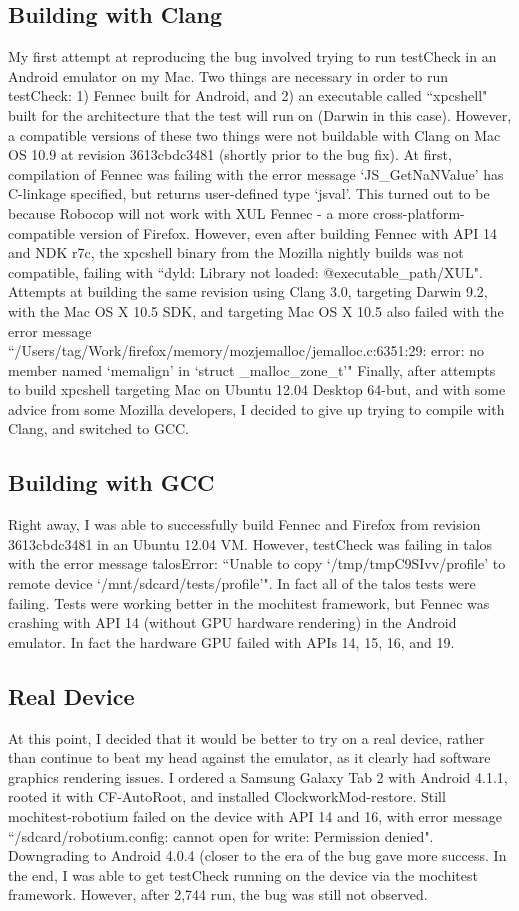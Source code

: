 \documentclass[letterpaper,twocolumn,10pt]{article}
\begin{document}
\subsection{Building with Clang}
My first attempt at reproducing the bug involved trying to run testCheck in an Android emulator on my Mac.  Two things are necessary in order to run testCheck: 1) Fennec built for Android, and 2) an executable called ``xpcshell" built for the architecture that the test will run on (Darwin in this case).  However, a compatible versions of these two things were not buildable with Clang on Mac OS 10.9 at revision 3613cbdc3481 (shortly prior to the bug fix).  At first, compilation of Fennec was failing with the error message `JS\_GetNaNValue' has C-linkage specified, but returns user-defined type `jsval'.  This turned out to be because Robocop will not work with XUL Fennec - a more cross-platform-compatible version of Firefox.  However, even after building Fennec with API 14 and NDK r7c, the xpcshell binary from the Mozilla nightly builds was not compatible, failing with ``dyld: Library not loaded: @executable\_path/XUL".
Attempts at building the same revision using Clang 3.0, targeting Darwin 9.2, with the Mac OS X 10.5 SDK, and targeting Mac OS X 10.5 also failed with the error message ``/Users/tag/Work/firefox/memory/mozjemalloc/jemalloc.c:6351:29: error: no member named `memalign' in `struct \_malloc\_zone\_t'"  Finally, after attempts to build xpcshell targeting Mac on Ubuntu 12.04 Desktop 64-but, and with some advice from some Mozilla developers, I decided to give up trying to compile with Clang, and switched to GCC.
\subsection{Building with GCC}
Right away, I was able to successfully build Fennec and Firefox from revision 3613cbdc3481 in an Ubuntu 12.04 VM.  However, testCheck was failing in talos with the error message talosError: ``Unable to copy `/tmp/tmpC9SIvv/profile' to remote device `/mnt/sdcard/tests/profile'".  In fact all of the talos tests were failing.  Tests were working better in the mochitest framework, but Fennec was crashing with API 14 (without GPU hardware rendering) in the Android emulator.  In fact the hardware GPU failed with APIs 14, 15, 16, and 19.
\subsection{Real Device}
At this point, I decided that it would be better to try on a real device, rather than continue to beat my head against the emulator, as it clearly had software graphics rendering issues.  I ordered a Samsung Galaxy Tab 2 with Android 4.1.1, rooted it with CF-AutoRoot, and installed ClockworkMod-restore.  Still mochitest-robotium failed on the device with API 14 and 16, with error message ``/sdcard/robotium.config: cannot open for write: Permission denied".  Downgrading to Android 4.0.4 (closer to the era of the bug gave more success.  In the end, I was able to get testCheck running on the device via the mochitest framework.  However, after 2,744 run, the bug was still not observed.
\end{document}
